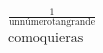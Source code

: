 \documentclass[preview]{standalone}
\begin{document}
\begin{align*}
\frac{1}{\mathrm{un número tan grande}} \\ \mathrm{como quieras}
\end{align*}
\end{document}
